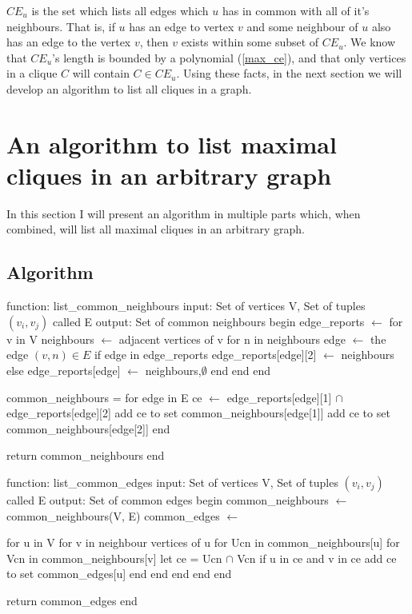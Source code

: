 \documentclass{article}
\theoremstyle{plain}
\theoremstyle{definition}
\theoremstyle{remark}
\newcommand{\ce}[1]{ {{CE}_{#1}} }
\begin{document}
\(\ce{u}\) is the set which lists all edges which \(u\) has in common with all of it's
neighbours. That is, if \(u\) has an edge to vertex \(v\) and some neighbour of \(u\) also
has an edge to the vertex \(v\), then \(v\) exists within some subset of \(\ce{u}\). We
know that \(\ce{u}\)'s length is bounded by a polynomial (\ref{max_ce}), and that only
vertices in a clique \(C\) will contain \(C \in \ce{u}\). Using these facts, in the next
section we will develop an algorithm to list all cliques in a graph.

\section{An algorithm to list maximal cliques in an arbitrary graph}
In this section I will present an algorithm in multiple parts which, when combined, will
list all maximal cliques in an arbitrary graph.

\subsection{Algorithm}
\begin{algorithm}[caption={Create Common Neighbour Set}, label={algo_cn_construct}]
function: list_common_neighbours
    input: Set of vertices V, Set of tuples $(v_i, v_j)$ called E
    output: Set of common neighbours
    begin
        edge_reports $\gets$ {}
        for v in V
            neighbours $\gets$ adjacent vertices of v
            for n in neighbours
                edge $\gets$ the edge $(v, n) \in E$
                if edge in edge_reports
                    edge_reports[edge][2] $\gets$ neighbours
                else
                    edge_reports[edge] $\gets$ {neighbours,$\emptyset$}
                end
            end
        end

        common_neighbours = {}
        for edge in E
            ce $\gets$ edge_reports[edge][1] $\cap$ edge_reports[edge][2]
            add ce to set common_neighbours[edge[1]]
            add ce to set common_neighbours[edge[2]]
        end

        return common_neighbours
    end
\end{algorithm}

\begin{algorithm}[caption={Create Common Edge Set}, label={algo_ce_construct}]
function: list_common_edges
    input: Set of vertices V, Set of tuples $(v_i, v_j)$ called E
    output: Set of common edges
    begin
        common_neighbours $\gets$ common_neighbours(V, E)
        common_edges $\gets$ {}

        for u in V
            for v in neighbour vertices of u
                for Ucn in common_neighbours[u]
                    for Vcn in common_neighbours[v]
                        let ce = Ucn $\cap$ Vcn
                        if u in ce and v in ce
                            add ce to set common_edges[u]
                        end
                    end
                end
            end
        end

        return common_edges
    end
\end{algorithm}
\end{document}
